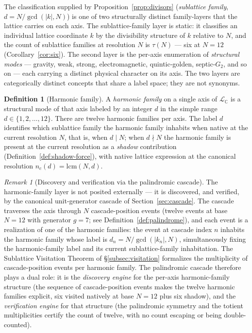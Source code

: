 \documentclass[11pt,a4paper]{article}
\theoremstyle{definition}
\newtheorem{definition}[theorem]{Definition}
\theoremstyle{remark}
\newtheorem{remark}[theorem]{Remark}
\begin{document}
The classification supplied by Proposition~\ref{prop:divisors} (\emph{sublattice family}, $d = N/\gcd(|k|,N)$) is one of two structurally distinct family-layers that the lattice carries on each axis. The sublattice-family layer is static: it classifies an individual lattice coordinate $k$ by the divisibility structure of $k$ relative to $N$, and the count of sublattice families at resolution $N$ is $\tau(N)$ --- six at $N=12$ (Corollary~\ref{cor:six}). The second layer is the per-axis enumeration of \emph{structural modes} --- gravity, weak, strong, electromagnetic, quintic-golden, septic-$G_{2}$, and so on --- each carrying a distinct physical character on its axis. The two layers are categorically distinct concepts that share a label space; they are not synonyms.

\begin{definition}[Harmonic family]\label{def:harmonic-family}
A \emph{harmonic family} on a single axis of $\mathcal{L}_{\mathbb{C}}$ is a structural mode of that axis labeled by an integer $d$ in the simple range $d \in \{1,2,\ldots,12\}$. There are twelve harmonic families per axis. The label $d$ identifies which sublattice family the harmonic family inhabits when native at the current resolution $N$, that is, when $d \mid N$; when $d \nmid N$ the harmonic family is present at the current resolution as a \emph{shadow} contribution (Definition~\ref{def:shadow-force}), with native lattice expression at the canonical resolution $n_{c}(d) = \mathrm{lcm}(N,d)$.
\end{definition}

\begin{remark}[Discovery and verification via the palindromic cascade]\label{rem:cascade-discovery}
The harmonic-family layer is not posited externally --- it is discovered, and verified, by the canonical unit-generator cascade of Section~\ref{sec:cascade}. The cascade traverses the axis through $N$ cascade-position events (twelve events at base $N=12$ with generator $g=7$; see Definition~\ref{def:palindrome}), and each event is a realization of one of the harmonic families: the event at cascade index $n$ inhabits the harmonic family whose label is $d_{n} = N/\gcd(|k_{n}|,N)$, simultaneously fixing the harmonic-family label and its current sublattice-family inhabitation. The Sublattice Visitation Theorem of \S\ref{subsec:visitation} formalizes the multiplicity of cascade-position events per harmonic family. The palindromic cascade therefore plays a dual role: it is the \emph{discovery engine} for the per-axis harmonic-family structure (the sequence of cascade-position events makes the twelve harmonic families explicit, six visited natively at base $N=12$ plus six shadow), and the \emph{verification engine} for that structure (the palindromic symmetry and the totient multiplicities certify the count of twelve, with no count escaping or being double-counted).
\end{remark}
\end{document}
